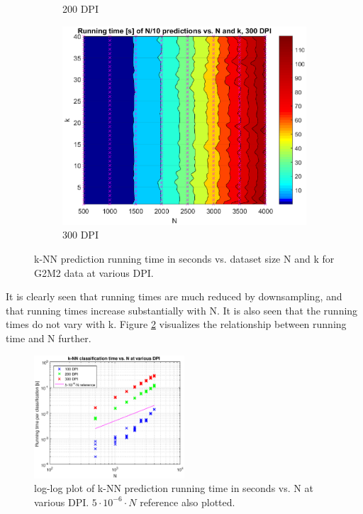 \begin{figure}[ht]
\begin{subfigure}[t]{0.3\textwidth}
		\caption{200 DPI}
	\end{subfigure}
	\begin{subfigure}[t]{0.3\textwidth}
		\includegraphics[width = \textwidth]{graphics/knn-runningtime-vs-n-and-k-2-2-dpi300}
		\caption{300 DPI}
	\end{subfigure}
	\caption{
		k-NN prediction running time in seconds
		vs. dataset size N and k for G2M2 data at various DPI.
		}
	\label{fig:knn-runningtime-vs-n-and-k}
\end{figure}

It is clearly seen that running times are much reduced by downsampling,
and that running times increase substantially with N. It is also seen that
the running times do not vary with k.
Figure \ref{fig:knn-runningtime-vs-n-loglog} visualizes the relationship
between running time and N further.
\begin{figure}[ht]
	\centering
	\includegraphics[width = 0.5\textwidth]{graphics/knn-runningtime-vs-n-loglog-2-2}
	\caption{
		log-log plot of k-NN prediction running time in seconds vs. N at various DPI.
		\(5\cdot{}10^{-6}\cdot{}N\) reference also plotted.
	}
	\label{fig:knn-runningtime-vs-n-loglog}
\end{figure}

